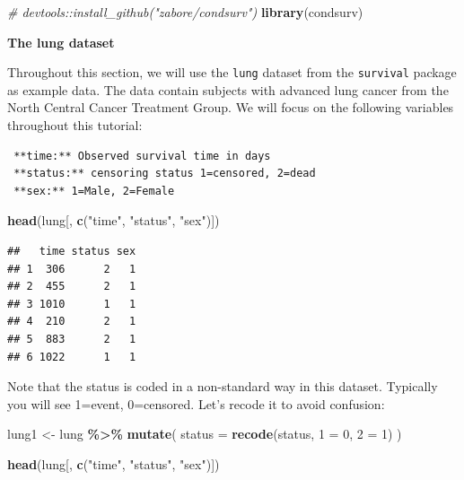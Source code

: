 \documentclass[
]{book}
\newenvironment{Shaded}{\begin{snugshade}}{\end{snugshade}}
\newcommand{\AttributeTok}[1]{\textcolor[rgb]{0.13,0.29,0.53}{#1}}
\newcommand{\CommentTok}[1]{\textcolor[rgb]{0.56,0.35,0.01}{\textit{#1}}}
\newcommand{\DecValTok}[1]{\textcolor[rgb]{0.00,0.00,0.81}{#1}}
\newcommand{\FunctionTok}[1]{\textcolor[rgb]{0.13,0.29,0.53}{\textbf{#1}}}
\newcommand{\NormalTok}[1]{#1}
\newcommand{\OtherTok}[1]{\textcolor[rgb]{0.56,0.35,0.01}{#1}}
\newcommand{\SpecialCharTok}[1]{\textcolor[rgb]{0.81,0.36,0.00}{\textbf{#1}}}
\newcommand{\StringTok}[1]{\textcolor[rgb]{0.31,0.60,0.02}{#1}}
\begin{document}
\begin{Shaded}
\begin{Highlighting}[]
\CommentTok{\# devtools::install\_github("zabore/condsurv")}
\FunctionTok{library}\NormalTok{(condsurv)}
\end{Highlighting}
\end{Shaded}

\textbf{The lung dataset}

Throughout this section, we will use the \texttt{lung} dataset from the \texttt{survival} package as example data. The data contain subjects with advanced lung cancer from the North Central Cancer Treatment Group. We will focus on the following variables throughout this tutorial:

\begin{verbatim}
 **time:** Observed survival time in days
 **status:** censoring status 1=censored, 2=dead
 **sex:** 1=Male, 2=Female
\end{verbatim}

\begin{Shaded}
\begin{Highlighting}[]
\FunctionTok{head}\NormalTok{(lung[, }\FunctionTok{c}\NormalTok{(}\StringTok{"time"}\NormalTok{, }\StringTok{"status"}\NormalTok{, }\StringTok{"sex"}\NormalTok{)])}
\end{Highlighting}
\end{Shaded}

\begin{verbatim}
##   time status sex
## 1  306      2   1
## 2  455      2   1
## 3 1010      1   1
## 4  210      2   1
## 5  883      2   1
## 6 1022      1   1
\end{verbatim}

Note that the status is coded in a non-standard way in this dataset. Typically you will see 1=event, 0=censored. Let's recode it to avoid confusion:

\begin{Shaded}
\begin{Highlighting}[]
\NormalTok{lung1 }\OtherTok{\textless{}{-}} 
\NormalTok{  lung }\SpecialCharTok{\%\textgreater{}\%} 
  \FunctionTok{mutate}\NormalTok{(}
    \AttributeTok{status =} \FunctionTok{recode}\NormalTok{(status, }\StringTok{\textquotesingle{}1\textquotesingle{}} \OtherTok{=} \DecValTok{0}\NormalTok{, }\StringTok{\textquotesingle{}2\textquotesingle{}} \OtherTok{=} \DecValTok{1}\NormalTok{)}
\NormalTok{  )}

\FunctionTok{head}\NormalTok{(lung[, }\FunctionTok{c}\NormalTok{(}\StringTok{"time"}\NormalTok{, }\StringTok{"status"}\NormalTok{, }\StringTok{"sex"}\NormalTok{)])}
\end{Highlighting}
\end{Shaded}
\end{document}
